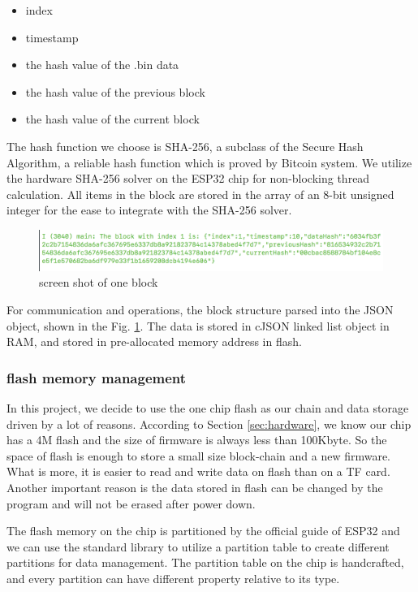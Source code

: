 \documentclass{article}
\begin{document}
        \begin{itemize}
          \item index
          \item timestamp
          \item the hash value of the .bin data
          \item the hash value of the previous block
          \item the hash value of the current block
        \end{itemize}

        The hash function we choose is SHA-256, a subclass of the Secure Hash Algorithm, a reliable hash function which is proved by Bitcoin system. We utilize the hardware SHA-256 solver on the ESP32 chip for non-blocking thread calculation. All items in the block are stored in the array of an 8-bit unsigned integer for the ease to integrate with the SHA-256 solver.

        \begin{figure}[h]
          \centering
          \includegraphics[scale=0.5]{lastest-block}
          \caption{screen shot of one block}
          \label{fig:lastest block}
        \end{figure}

        For communication and operations, the block structure parsed into the JSON object, shown in the Fig. \ref{fig:lastest block}. The data is stored in cJSON linked list object in RAM, and stored in pre-allocated memory address in flash.

      \subsubsection{flash memory management}
          In this project, we decide to use the one chip flash as our chain and data storage driven by a lot of reasons. According to Section \ref{sec:hardware}, we know our chip has a 4M flash and the size of firmware is always less than 100Kbyte. So the space of flash is enough to store a small size block-chain and a new firmware. What is more, it is easier to read and write data on flash than on a TF card. Another important reason is the data stored in flash can be changed by the program and will not be erased after power down.

          The flash memory on the chip is partitioned by the official guide of ESP32 and we can use the standard library to utilize a partition table to create different partitions for data management. The partition table on the chip is handcrafted, and every partition can have different property relative to its type.
\end{document}
